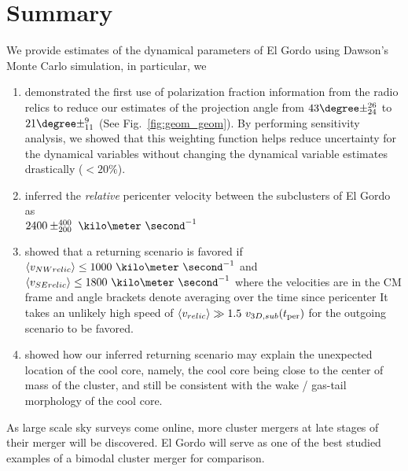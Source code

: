 \section{Summary} 
We provide estimates of the dynamical parameters of El Gordo using Dawson's
Monte Carlo simulation, in particular, we 
\begin{enumerate}
	\item demonstrated the first use of polarization fraction information from
		the radio relics to reduce our estimates of the projection angle from
		$43\degree \pm ^{26}_{24}$ to $21 \degree \pm^{9}_{11}$ (See
		Fig.~\ref{fig:geom_geom}). By performing sensitivity analysis, we
		showed that this weighting function helps reduce uncertainty for the dynamical
		variables without changing the dynamical variable estimates drastically ($< 20\%$).\\ 
	\item inferred the {\it relative} pericenter velocity 
		between the subclusters of El Gordo as\\ 
		$2400\pm^{400}_{200}~\kilo\meter~\second^{-1}$ \\ 
	\item showed that a returning scenario is favored if $\langle v_{NW relic}\rangle \leq
		1000~\kilo
		\meter~\second^{-1}$ and $\langle v_{SE relic}\rangle \leq
		1800~\kilo\meter~\second^{-1}$
where the velocities are in the CM frame and angle brackets denote averaging over the time since pericenter
		It takes
		an unlikely high speed of $\langle v_{relic} \rangle \gg 1.5~v_{3D,
		sub}(t_{\rm per})$ for the outgoing scenario to be favored. \\ 
	\item showed how our inferred
		returning scenario may explain the unexpected location of the cool
		core, namely, the cool core being close to the center of mass of the
		cluster, and still be consistent with the wake / gas-tail morphology of the cool core. 
\end{enumerate}
As large scale sky surveys come online, more cluster mergers at late
stages of their merger will be discovered. El Gordo will serve as one of
the best studied examples of a bimodal cluster merger for comparison.  

